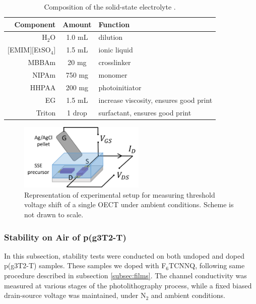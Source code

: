 \begin{table}[h]
	\centering
	\caption{Composition of the solid-state electrolyte \cite{weissbachPhotopatternableSolidElectrolyte2022}.}
	\begin{tabular}{r c l} \hline
		Component   & Amount & Function \\ \hline
		H$_{2}$O	& 1.0 mL & dilution \\ 
		$[$EMIM$][$EtSO$_{4}]$   & 1.5 mL & ionic liquid \\ 
		MBBAm   & 20 mg & crosslinker \\ 
		NIPAm   & 750 mg & monomer \\ 
		HHPAA   & 200 mg & photoinitiator \\
		EG	& 1.5 mL	& increase viscosity, ensures good print \\ 
		Triton & 1 drop & surfactant, ensures good print \\  \hline
	\end{tabular}
	\label{tab:sse}
\end{table}

\begin{figure}[!ht]
	\centering
	\includegraphics[width=6cm]{Images/pdf/bioprobe_setup.pdf}
	\caption{Representation of experimental setup for measuring threshold voltage shift of a single OECT under ambient conditions. Scheme is not drawn to scale.}
	\label{fig:biosetup}
\end{figure}

\subsubsection{Stability on Air of p(g3T2-T)}
In this subsection, stability tests were conducted on both undoped and doped p(g3T2-T) samples. These samples we doped with F$_{6}$TCNNQ, following same procedure described in subsection \ref{subsec:films}. The channel conductivity was measured at various stages of the photolithography process, while a fixed biased drain-source voltage was maintained, under N$_{2}$ and ambient conditions. %


